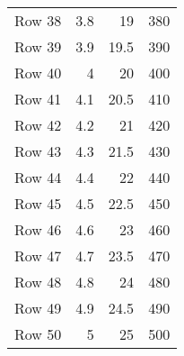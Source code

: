\begin{center}
{\begin{longtable}[H!]{@{\extracolsep{\fill}}lrrr}
Row 38  & 3.8 & 19   & 380  \\
Row 39  & 3.9 & 19.5 & 390  \\
Row 40  & 4   & 20   & 400  \\
Row 41  & 4.1 & 20.5 & 410  \\
Row 42  & 4.2 & 21   & 420  \\
Row 43  & 4.3 & 21.5 & 430  \\
Row 44  & 4.4 & 22   & 440  \\
Row 45  & 4.5 & 22.5 & 450  \\
Row 46  & 4.6 & 23   & 460  \\
Row 47  & 4.7 & 23.5 & 470  \\
Row 48  & 4.8 & 24   & 480  \\
Row 49  & 4.9 & 24.5 & 490  \\
Row 50  & 5   & 25   & 500  \\

\end{longtable}
}
\end{center}